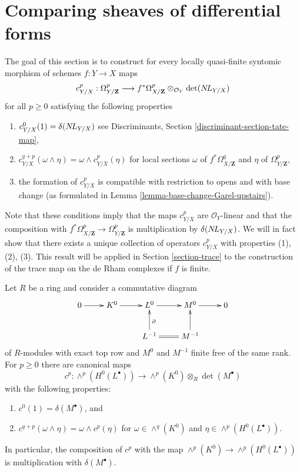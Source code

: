 \section{Comparing sheaves of differential forms}
\label{section-quasi-finite-syntomic}

\noindent
The goal of this section is to construct for every locally quasi-finite
syntomic morphism of schemes $f : Y \to X$ maps
$$
c^p_{Y/X} :
\Omega^p_{Y/\mathbf{Z}}
\longrightarrow
f^*\Omega^p_{X/\mathbf{Z}} \otimes_{\mathcal{O}_Y} \det(\mathop{N\!L}\nolimits_{Y/X})
$$
for all $p \geq 0$ satisfying the following properties
\begin{enumerate}
\item
\label{item-degree-zero}
$c_{Y/X}^0(1) = \delta(\mathop{N\!L}\nolimits_{Y/X})$ see
Discriminants, Section \ref{discriminant-section-tate-map},
\item
\label{item-multiplicative}
$c_{Y/X}^{q + p}(\omega \wedge \eta) = \omega \wedge c_{Y/X}^p(\eta)$
for local sections $\omega$ of $f^*\Omega^q_{X/\mathbf{Z}}$
and $\eta$ of $\Omega^p_{Y/\mathbf{Z}}$,
\item
\label{item-base-change}
the formation of $c^p_{Y/X}$ is compatible with restriction to opens
and with base change
(as formulated in Lemma \ref{lemma-base-change-Garel-upstairs}).
\end{enumerate}
Note that these conditions imply that the maps $c^p_{Y/X}$ are
$\mathcal{O}_Y$-linear and that the composition with
$f^*\Omega^p_{X/\mathbf{Z}} \to \Omega^p_{Y/\mathbf{Z}}$
is multiplication by $\delta(\mathop{N\!L}\nolimits_{Y/X})$.
We will in fact show that there exists a unique collection of operators
$c^p_{Y/X}$ with properties (1), (2), (3). This result will be applied in
Section \ref{section-trace} to the construction of the trace map on
the de Rham complexes if $f$ is finite.

\begin{lemma}
\label{lemma-funny-map}
Let $R$ be a ring and consider a commutative diagram
$$
\xymatrix{
0 \ar[r] &
K^0 \ar[r] &
L^0 \ar[r] &
M^0 \ar[r] & 0 \\
& & L^{-1} \ar[u]_\partial \ar@{=}[r] &
M^{-1} \ar[u]
}
$$
of $R$-modules with exact top row and $M^0$ and $M^{-1}$
finite free of the same rank. For $p \geq 0$ there are canonical maps
$$
c^p : 
\wedge^p(H^0(L^\bullet))
\longrightarrow
\wedge^p(K^0) \otimes_R \det(M^\bullet)
$$
with the following properties:
\begin{enumerate}
\item $c^0(1) = \delta(M^\bullet)$, and
\item $c^{q + p}(\omega \wedge \eta) = \omega \wedge c^p(\eta)$
for $\omega \in \wedge^q(K^0)$ and $\eta \in \wedge^p(H^0(L^\bullet))$.
\end{enumerate}
In particular, the composition of $c^p$ with the map
$\wedge^p(K^0) \to \wedge^p(H^0(L^\bullet))$ is multiplication
with $\delta(M^\bullet)$.
\end{lemma}

